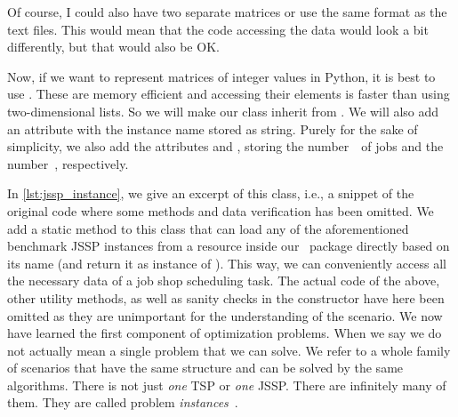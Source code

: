 Of course, I could also have two separate matrices or use the same format as the text files.
This would mean that the code accessing the data would look a bit differently, but that would also be OK.

Now, if we want to represent matrices of integer values in Python, it is best to use \numpyndarrays.
These are memory efficient and accessing their elements is faster than using two-dimensional lists.
So we will make our class inherit from \numpyndarray.
We will also add an attribute  with the instance name stored as string.
Purely for the sake of simplicity, we also add the attributes  and , storing the number~\jsspJobs\ of jobs and the number~\jsspMachines, respectively.


In \autoref{lst:jssp_instance}, we give an excerpt of this class, i.e., a snippet of the original code where some methods and data verification has been omitted.
We add a static method  to this class that can load any of the aforementioned benchmark \gls{JSSP} instances from a resource inside our \moptipy\ package directly based on its name (and return it as instance of ).
This way, we can conveniently access all the necessary data of a job shop scheduling task.
The actual code of the above, other utility methods, as well as sanity checks in the  constructor have here been omitted as they are unimportant for the understanding of the scenario.%
\endhsection%
\endhsection%
%
%
We now have learned the first component of optimization problems.
When we say  we do not actually mean a single problem that we can solve.
We refer to a whole family of scenarios that have the same structure and can be solved by the same algorithms.
There is not just \emph{one} \gls{TSP} or \emph{one} \gls{JSSP}.
There are infinitely many of them.
They are called problem \emph{instances}~\instance.%
\endhsection%
\endhsection%
%
